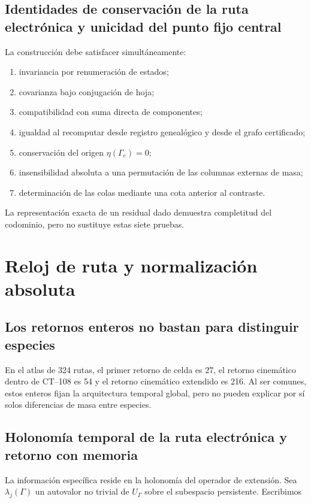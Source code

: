 \subsection{Identidades de conservación de la ruta electrónica y unicidad del punto fijo central}
La construcción debe satisfacer simultáneamente:

\begin{enumerate}
\item invariancia por renumeración de estados;
\item covarianza bajo conjugación de hoja;
\item compatibilidad con suma directa de componentes;
\item igualdad al recomputar desde registro genealógico y desde el grafo certificado;
\item conservación del origen \(\eta(\Gamma_e)=0\);
\item insensibilidad absoluta a una permutación de las columnas externas de masa;
\item determinación de las colas mediante una cota anterior al contraste.
\end{enumerate}
La representación exacta de un residual dado demuestra completitud del codominio, pero no sustituye estas siete pruebas.

\section{Reloj de ruta y normalización absoluta}
\subsection{Los retornos enteros no bastan para distinguir especies}
En el atlas de 324 rutas, el primer retorno de celda es 27, el retorno cinemático dentro de CT--108 es 54 y el retorno cinemático extendido es 216. Al ser comunes, estos enteros fijan la arquitectura temporal global, pero no pueden explicar por sí solos diferencias de masa entre especies.

\subsection{Holonomía temporal de la ruta electrónica y retorno con memoria}
La información específica reside en la holonomía del operador de extensión. Sea \(\lambda_j(\Gamma)\) un autovalor no trivial de \(U_\Gamma\) sobre el subespacio persistente. Escribimos

